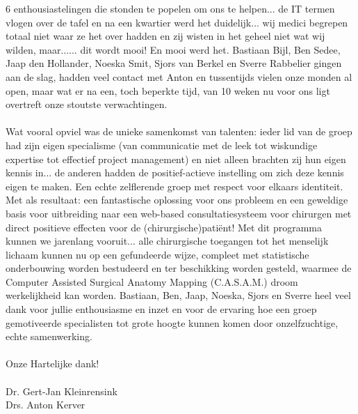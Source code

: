 6 enthousiastelingen die stonden te popelen om ons te helpen... 
de IT termen vlogen over de tafel en na een kwartier werd het duidelijk... 
wij medici begrepen totaal niet waar ze het over hadden en zij wisten in het geheel niet wat wij wilden, maar...... dit wordt mooi! 
En mooi werd het. 
Bastiaan Bijl, Ben Sedee, Jaap den Hollander, Noeska Smit, Sjors van Berkel en Sverre Rabbelier gingen aan de slag, hadden veel contact met Anton en tussentijds vielen onze monden al open, maar wat er na een, toch beperkte tijd, van 10 weken nu voor ons ligt overtreft onze stoutste verwachtingen. 
\\
\\
Wat vooral opviel was de unieke samenkomst van talenten: ieder lid van de groep had zijn eigen specialisme (van communicatie met de leek tot wiskundige expertise tot effectief project management) en niet alleen brachten zij hun eigen kennis in... 
de anderen hadden de positief-actieve instelling om zich deze kennis eigen te maken. 
Een echte zelflerende groep met respect voor elkaars identiteit. 
Met als resultaat: een fantastische oplossing voor ons probleem en een geweldige basis voor uitbreiding naar een web-based consultatiesysteem voor chirurgen met direct positieve effecten voor de (chirurgische)pati\"{e}nt! 
Met dit programma kunnen we jarenlang vooruit... alle chirurgische toegangen tot het menselijk lichaam kunnen nu op een gefundeerde wijze, compleet met statistische onderbouwing worden bestudeerd en ter beschikking worden gesteld, waarmee de Computer Assisted Surgical Anatomy Mapping (C.A.S.A.M.) droom werkelijkheid kan worden. 
Bastiaan, Ben, Jaap, Noeska, Sjors en Sverre heel veel dank voor jullie enthousiasme en inzet en voor de ervaring hoe een groep gemotiveerde specialisten tot grote hoogte kunnen komen door onzelfzuchtige, echte samenwerking. 
\\
\\
Onze Hartelijke dank!
\\
\\
Dr. Gert-Jan Kleinrensink
\\
Drs. Anton Kerver
